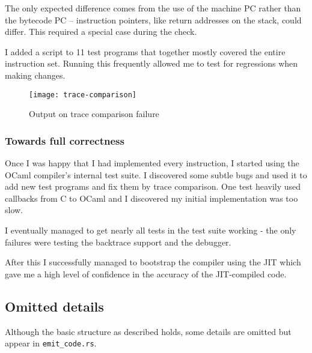 The only expected difference comes from the use of the machine PC rather than the bytecode PC --
instruction pointers, like return addresses on the stack, could differ. This required a special
case during the check.

I added a script to 11 test programs that together mostly covered the entire instruction
set. Running this frequently allowed me to test for regressions when making changes.

\begin{figure}[h]
      \texttt{[image: trace-comparison]}
      \caption{Output on trace comparison failure}
      \label{fig:trace-comparison}
\end{figure}

\subsubsection{Towards full correctness}

Once I was happy that I had implemented every instruction, I started using
the OCaml compiler's internal test suite. I discovered some subtle bugs and used it to add new test
programs and fix them by trace comparison. One test heavily used callbacks from C to OCaml and I
discovered my initial implementation was too slow.

I eventually managed to get nearly all tests in the test suite working - the only failures were
testing the backtrace support and the debugger.

After this I successfully managed to bootstrap the compiler using the JIT which gave me a high
level
of confidence in the accuracy of the JIT-compiled code.

\subsection{Omitted details}

Although the basic structure as described holds, some details are omitted but appear in
\texttt{emit\_code.rs}.

